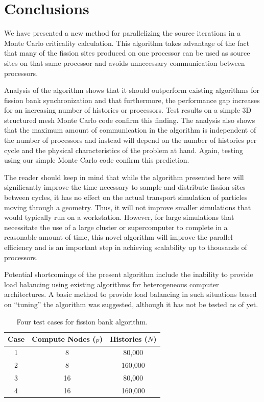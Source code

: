 \documentclass[11pt]{article}
\begin{document}
\section{Conclusions}
\label{sec:conclusions}

We have presented a new method for parallelizing the source iterations
in a Monte Carlo criticality calculation. This algorithm takes
advantage of the fact that many of the fission sites produced on one
processor can be used as source sites on that same processor and
avoids unnecessary communication between processors.

Analysis of the algorithm shows that it should outperform existing
algorithms for fission bank synchronization and that furthermore, the
performance gap increases for an increasing number of histories or
processors. Test results on a simple 3D structured mesh Monte Carlo
code confirm this finding. The analysis also shows that the maximum
amount of communication in the algorithm is independent of the number
of processors and instead will depend on the number of histories per
cycle and the physical characteristics of the problem at hand. Again,
testing using our simple Monte Carlo code confirm this prediction.

The reader should keep in mind that while the algorithm presented here
will significantly improve the time necessary to sample and distribute
fission sites between cycles, it has no effect on the actual transport
simulation of particles moving through a geometry. Thus, it will not
improve smaller simulations that would typically run on a
workstation. However, for large simulations that necessitate the use
of a large cluster or supercomputer to complete in a reasonable amount
of time, this novel algorithm will improve the parallel efficiency and
is an important step in achieving scalability up to thousands of
processors.

Potential shortcomings of the present algorithm include the inability
to provide load balancing using existing algorithms for heterogeneous
computer architectures. A basic method to provide load balancing in
such situations based on ``tuning'' the algorithm was suggested,
although it has not be tested as of yet.

\appendix

\pagebreak
\begin{singlespace}


\end{singlespace}

\clearpage
\begin{table}[ht]
  \centering
  \caption{Four test cases for fission bank algorithm.}
  \label{tab:cases}
  \begin{tabular}{|c|c|c|}
    \hline
    Case & Compute Nodes ($p$) & Histories ($N$) \\
    \hline
    1 & 8 & 80,000 \\
    2 & 8 & 160,000 \\
    3 & 16 & 80,000 \\
    4 & 16 & 160,000 \\
    \hline
  \end{tabular}
\end{table}
\end{document}
